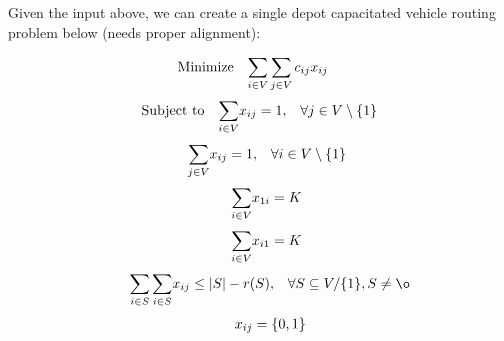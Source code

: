 Given the input above, we can create a single depot capacitated vehicle routing problem below (needs proper alignment):

\vspace{0.5cm}

\begin{equation}
    \begin{array}{ll@{}ll}
        \text{Minimize} & \displaystyle\sum\limits_{i \in V}\sum\limits_{j \in V} c_{ij}&x_{ij} &\\
    \end{array}
\end{equation}
\begin{equation}
    \begin{array}{ll@{}ll}
        \text{Subject to}&\displaystyle\sum\limits_{i \in V}   &x_{ij} = 1,  &\forall j \in V \setminus \{1\}\\
    \end{array}
\end{equation}
\begin{equation}
    \begin{array}{ll@{}ll}
        & \displaystyle\sum\limits_{j \in V}   &x_{ij} = 1,  &\forall i \in V \setminus \{1\}\\
    \end{array}
\end{equation}
\begin{equation}
    \begin{array}{ll@{}ll}
        & \displaystyle\sum\limits_{i \in V}   &x_{1i} = K\\
    \end{array}
\end{equation}
\begin{equation}
    \begin{array}{ll@{}ll}
        & \displaystyle\sum\limits_{i \in V}   &x_{i1} = K\\
    \end{array}
\end{equation}
\begin{equation}
    \begin{array}{ll@{}ll@{}ll}
        & \displaystyle\sum\limits_{i \in S}\sum\limits_{i \in S}  &x_{ij} \leq |S| - r(S), &\forall S \subseteq V/ \{1\} , S \neq \o \\
    \end{array}
\end{equation}
\begin{equation}
    \begin{array}{ll@{}ll@{}ll}
        & x_{ij} = \{0,1\}\\
    \end{array}
\end{equation}

